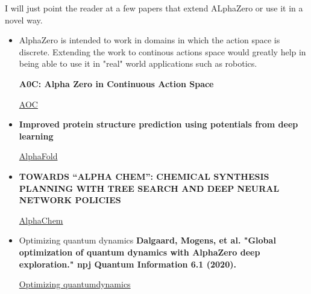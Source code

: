 I will just point the reader at a few papers that extend ALphaZero or use it in a novel way. 

\begin{itemize}
    \item AlphaZero is intended to work in domains in which the action space is discrete. Extending the work to continous actions space would greatly help in being able to use it in "real" world applications such as robotics. 
    
    \textbf{A0C: Alpha Zero in Continuous Action Space}
    
    \href{https://arxiv.org/pdf/1805.09613.pdf}{AOC}
    
    
    \item \textbf{Improved protein structure prediction using potentials from deep learning}
    
    \href{https://www.nature.com/articles/s41586-019-1923-7}{AlphaFold}
    
    \item \textbf{TOWARDS “ALPHA CHEM”: CHEMICAL SYNTHESIS PLANNING WITH TREE SEARCH AND
    DEEP NEURAL NETWORK POLICIES}
    
    \href{https://arxiv.org/pdf/1702.00020.pdf}{AlphaChem}
    
    \item Optimizing quantum dynamics
    \textbf{Dalgaard, Mogens, et al. "Global optimization of quantum dynamics with AlphaZero deep exploration." npj Quantum Information 6.1 (2020).}
    
    \href{https://www.nature.com/articles/s41534-019-0241-0.pdf?origin=ppub}{Optimizing quantumdynamics}
    
\end{itemize}

